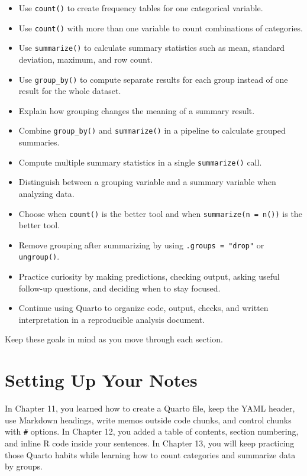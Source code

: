 \documentclass[
]{article}
\begin{document}
\begin{itemize}
\item
  Use \texttt{count()} to create frequency tables for one categorical
  variable.
\item
  Use \texttt{count()} with more than one variable to count combinations
  of categories.
\item
  Use \texttt{summarize()} to calculate summary statistics such as mean,
  standard deviation, maximum, and row count.
\item
  Use \texttt{group\_by()} to compute separate results for each group
  instead of one result for the whole dataset.
\item
  Explain how grouping changes the meaning of a summary result.
\item
  Combine \texttt{group\_by()} and \texttt{summarize()} in a pipeline to
  calculate grouped summaries.
\item
  Compute multiple summary statistics in a single \texttt{summarize()}
  call.
\item
  Distinguish between a grouping variable and a summary variable when
  analyzing data.
\item
  Choose when \texttt{count()} is the better tool and when
  \texttt{summarize(n\ =\ n())} is the better tool.
\item
  Remove grouping after summarizing by using \texttt{.groups\ =\ "drop"}
  or \texttt{ungroup()}.
\item
  Practice curiosity by making predictions, checking output, asking
  useful follow-up questions, and deciding when to stay focused.
\item
  Continue using Quarto to organize code, output, checks, and written
  interpretation in a reproducible analysis document.
\end{itemize}

Keep these goals in mind as you move through each section.

\section{Setting Up Your Notes}\label{setting-up-your-notes}

In Chapter 11, you learned how to create a Quarto file, keep the YAML
header, use Markdown headings, write memos outside code chunks, and
control chunks with \texttt{\#\textbar{}} options. In Chapter 12, you
added a table of contents, section numbering, and inline R code inside
your sentences. In Chapter 13, you will keep practicing those Quarto
habits while learning how to count categories and summarize data by
groups.
\end{document}
